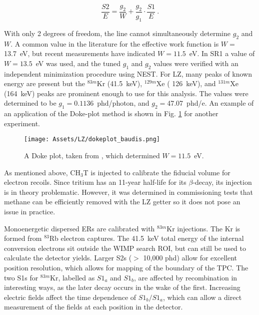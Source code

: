 \begin{equation}
    \frac{S2}{E} = \frac{g_2}{W} +  \frac{g_2}{g_1} \cdot \frac{S1}{E}~.
\end{equation}

With only 2 degrees of freedom, the line cannot simultaneously determine $g_2$ and $W$.
A common value in the literature for the effective work function is  $W=$13.7~eV\cite{dahl_physics_2009}, but recent measurements have indicated $W=11.5$~eV\cite{collaboration_measurement_2020, baudis_measurement_2021}.
In SR1 a value of $W=13.5$~eV was used, and the tuned $g_1$ and $g_2$ values were verified with an independent minimization procedure using NEST\cite{szydagis_review_2021}.
For LZ, many peaks of known energy are present but the $^{83m}$Kr (41.5~keV), $^{129m}$Xe ( 126~keV), and $^{131m}$Xe (164~keV) peaks are prominent enough to use for this analysis.
The values were determined to be $g_1=0.1136$~phd/photon, and $g_2=$47.07~phd/e\cite{aalbers_first_2022}.
An example of an application of the Doke-plot method is shown in Fig. \ref{fig:dokeplot} for another experiment\cite{baudis_measurement_2021}.


\begin{figure}
    \centering
    \texttt{[image: Assets/LZ/dokeplot\_baudis.png]}
    \caption[A Doke plot, taken from \cite{baudis_measurement_2021}, which determined $W=11.5$~eV.]%
    {A Doke plot, taken from \cite{baudis_measurement_2021}, which determined $W=11.5$~eV.}
    \label{fig:dokeplot}
\end{figure}

As mentioned above, CH$_3$T is injected to calibrate the fiducial volume for electron recoils. 
Since tritium has an 11-year half-life for its $\beta$-decay, its injection is in theory problematic.
However, it was determined in commissioning tests that methane can be efficiently removed with the LZ getter so it does not pose an issue in practice.

Monoenergetic dispersed ERs are calibrated with  $^{83m}$Kr injections.
The Kr is formed from $^{83}$Rb electron captures.
The 41.5~keV total energy of the internal conversion electrons sit outside the WIMP search ROI, but can still be used to calculate the detector yields.
Larger S2s ($>$ 10,000 phd) allow for excellent position resolution, which allows for mapping of the boundary of the TPC\cite{lux_collaboration_position_2018}.
The two S1s for $^{83m}$Kr, labelled as $S1_a$ and $S1_b$, are affected by recombination in interesting ways, as the later decay occurs in the wake of the first. Increasing electric fields affect the time dependence of $S1_b/S1_a$\cite{singh_analysis_2020}, which can allow a direct measurement of the fields at each position in the detector.

